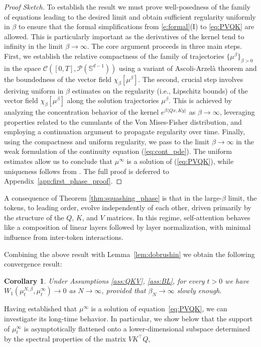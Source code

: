 \documentclass{article}
\numberwithin{theorem}{section}
\newtheorem{corollary}[theorem]{Corollary}
\begin{document}
\begin{proof}[Proof Sketch]
To establish the result we must prove well-posedness of the family of equations leading to the desired limit and obtain sufficient regularity uniformly in $\beta$ to ensure that the formal simplifications from \eqref{e:formal}(I) to \eqref{eq:PVQK} are allowed. This is particularly important as the derivatives of the kernel tend to infinity in the limit $\beta\to\infty$. The core argument proceeds in three main steps. First, we establish the relative compactness of the family of trajectories $\{\mu^\beta\}_{\beta > 0}$ in the space $\mathcal{C}([0,T], \mathcal{P}(\mathbb{S}^{d-1}))$ using a variant of Ascoli-Arzel\`a theorem and the boundedness of the vector field $\chi_\beta[\mu^\beta]$.
 The second, crucial step involves deriving uniform in $\beta$ estimates on the regularity (i.e., Lipschitz bounds) of the vector field $\chi_\beta[\mu^\beta]$ along the solution trajectories $\mu^\beta$. This is achieved by analyzing the concentration behavior of the kernel $e^{\beta\langle Qx, Ky\rangle}$ as $\beta \to \infty$, leveraging properties related to the cumulants of the Von Mises-Fisher distribution, and employing a continuation argument to propagate regularity over time.
Finally, using the compactness and uniform regularity, we pass to the limit $\beta \to \infty$ in the weak formulation of the continuity equation (\ref{eq:cont_pde}). The uniform estimates allow us to conclude that $\mu^\infty$ is a solution of (\ref{eq:PVQK}), while  uniqueness follows from \cite{ambrosio2008transport}. The full proof is deferred to Appendix~\ref{app:first_phase_proof}.
\end{proof}
A consequence of Theorem \ref{thm:squashing_phase} is that in the large-$\beta$ limit, the tokens, to leading order, evolve independently of each other, driven primarily by the structure of the $Q$, $K$, and $V$ matrices. In this regime, self-attention behaves like a composition of linear layers followed by layer normalization, with minimal influence from inter-token interactions.

Combining the above result with Lemma~\ref{lem:dobrushin}
 we obtain the following convergence result:
 \begin{corollary}
Under Assumptions \ref{ass:QKV}, \ref{ass:BL}, for every $t>0$ we have $W_1(\mu_t^{N,\beta}, \mu^\infty_t) \to 0$ as $N \to \infty$, provided that $\beta_N\to \infty$ slowly enough.
\end{corollary}
Having established that $\mu^\infty$ is a solution of equation~\eqref{eq:PVQK}, we can investigate its long-time behavior. In particular, we show below that the support of $\mu^\infty_t$ is asymptotically flattened onto a lower-dimensional subspace determined by the spectral properties of the matrix $VK^\top Q$,
\end{document}
